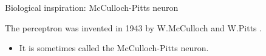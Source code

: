 %
%
%

\begin{frame}[t]{Biological inspiration: McCulloch-Pitts neuron}

    The \gls{perceptron} was invented in 1943 
    by W.McCulloch and W.Pitts \cite{McCulloch:1943p}.
    \begin{itemize}
      \item It is sometimes called the \gls{McCulloch-Pitts neuron}.
    \end{itemize}

    \begin{columns}[t]
        \begin{column}{0.50\textwidth}
         \begin{center}
         \end{center}
        \end{column}
        \begin{column}{0.50\textwidth}
            \begin{center}
             \end{center}
        \end{column}
    \end{columns}

\end{frame}

